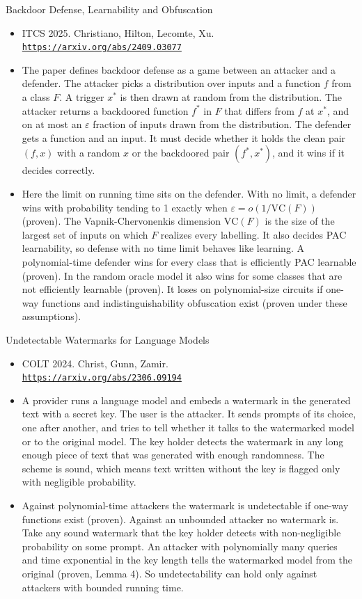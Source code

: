 \documentclass[aspectratio=169,10pt]{beamer}
\newcommand{\venue}[3]{\item #1. #2.\\ \href{#3}{\nolinkurl{#3}}}
\begin{document}
\begin{frame}{Backdoor Defense, Learnability and Obfuscation}
  \begin{itemize}
    \venue{ITCS 2025}{Christiano, Hilton, Lecomte, Xu}{https://arxiv.org/abs/2409.03077}
    \item The paper defines backdoor defense as a game between an attacker and a defender. The attacker picks a distribution over inputs and a function $f$ from a class $F$. A trigger $x^*$ is then drawn at random from the distribution. The attacker returns a backdoored function $f^*$ in $F$ that differs from $f$ at $x^*$, and on at most an $\varepsilon$ fraction of inputs drawn from the distribution. The defender gets a function and an input. It must decide whether it holds the clean pair $(f,x)$ with a random $x$ or the backdoored pair $(f^*,x^*)$, and it wins if it decides correctly.
    \item Here the limit on running time sits on the defender. With no limit, a defender wins with probability tending to 1 exactly when $\varepsilon=o(1/\mathrm{VC}(F))$ (proven). The Vapnik-Chervonenkis dimension $\mathrm{VC}(F)$ is the size of the largest set of inputs on which $F$ realizes every labelling. It also decides PAC learnability, so defense with no time limit behaves like learning. A polynomial-time defender wins for every class that is efficiently PAC learnable (proven). In the random oracle model it also wins for some classes that are not efficiently learnable (proven). It loses on polynomial-size circuits if one-way functions and indistinguishability obfuscation exist (proven under these assumptions).
  \end{itemize}
\end{frame}

\begin{frame}{Undetectable Watermarks for Language Models}
  \begin{itemize}
    \venue{COLT 2024}{Christ, Gunn, Zamir}{https://arxiv.org/abs/2306.09194}
    \item A provider runs a language model and embeds a watermark in the generated text with a secret key. The user is the attacker. It sends prompts of its choice, one after another, and tries to tell whether it talks to the watermarked model or to the original model. The key holder detects the watermark in any long enough piece of text that was generated with enough randomness. The scheme is sound, which means text written without the key is flagged only with negligible probability.
    \item Against polynomial-time attackers the watermark is undetectable if one-way functions exist (proven). Against an unbounded attacker no watermark is. Take any sound watermark that the key holder detects with non-negligible probability on some prompt. An attacker with polynomially many queries and time exponential in the key length tells the watermarked model from the original (proven, Lemma 4). So undetectability can hold only against attackers with bounded running time.
  \end{itemize}
\end{frame}
\end{document}
